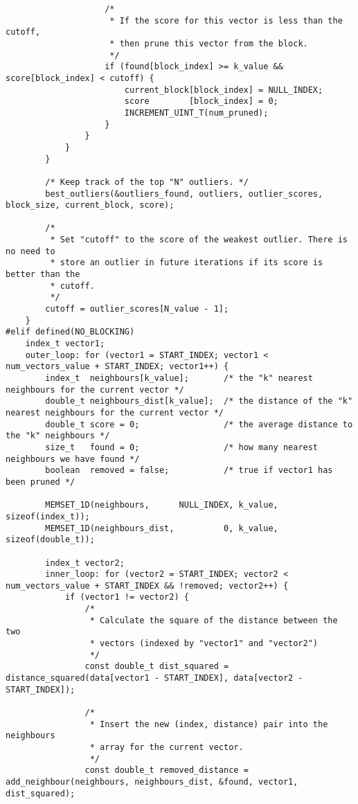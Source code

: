 \begin{lstlisting}
                    /*
                     * If the score for this vector is less than the cutoff,
                     * then prune this vector from the block.
                     */
                    if (found[block_index] >= k_value && score[block_index] < cutoff) {
                        current_block[block_index] = NULL_INDEX;
                        score        [block_index] = 0;
                        INCREMENT_UINT_T(num_pruned);
                    }
                }
            }
        }
        
        /* Keep track of the top "N" outliers. */
        best_outliers(&outliers_found, outliers, outlier_scores, block_size, current_block, score);
        
        /*
         * Set "cutoff" to the score of the weakest outlier. There is no need to
         * store an outlier in future iterations if its score is better than the
         * cutoff.
         */
        cutoff = outlier_scores[N_value - 1];
    }
#elif defined(NO_BLOCKING)
    index_t vector1;
    outer_loop: for (vector1 = START_INDEX; vector1 < num_vectors_value + START_INDEX; vector1++) {
        index_t  neighbours[k_value];       /* the "k" nearest neighbours for the current vector */
        double_t neighbours_dist[k_value];  /* the distance of the "k" nearest neighbours for the current vector */
        double_t score = 0;                 /* the average distance to the "k" neighbours */
        size_t   found = 0;                 /* how many nearest neighbours we have found */
        boolean  removed = false;           /* true if vector1 has been pruned */
        
        MEMSET_1D(neighbours,      NULL_INDEX, k_value, sizeof(index_t));
        MEMSET_1D(neighbours_dist,          0, k_value, sizeof(double_t));
        
        index_t vector2;
        inner_loop: for (vector2 = START_INDEX; vector2 < num_vectors_value + START_INDEX && !removed; vector2++) {
            if (vector1 != vector2) {
                /*
                 * Calculate the square of the distance between the two
                 * vectors (indexed by "vector1" and "vector2")
                 */
                const double_t dist_squared = distance_squared(data[vector1 - START_INDEX], data[vector2 - START_INDEX]);
                
                /*
                 * Insert the new (index, distance) pair into the neighbours
                 * array for the current vector.
                 */
                const double_t removed_distance = add_neighbour(neighbours, neighbours_dist, &found, vector1, dist_squared);
                

\end{lstlisting}
